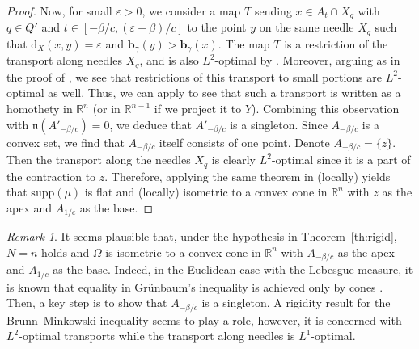 \documentclass[sts]{imsart}
\theoremstyle{definition}
\theoremstyle{remark}
\newtheorem{remark}[theorem]{Remark}
\newcommand{\R}{\mathbb{R}}
\newcommand{\bb}{\mathbf{b}}
\newcommand{\fn}{\mathfrak{n}}
\newcommand{\dist}{\mathrm{d}}
\newcommand{\ve}{\varepsilon}
\newcommand{\supp}{\mathrm{supp}}
\begin{document}
\begin{proof}
Now, for small $\ve >0$, we consider a map $T$ sending $x \in A_t \cap X_q$ with $q \in Q'$ and $t \in [-\beta/c,(\ve-\beta)/c]$ to the point $y$ on the same needle $X_q$ such that $\dist_X(x,y)=\ve$ and $\bb_\gamma(y) >\bb_\gamma(x)$.
The map $T$ is a restriction of the transport along needles $X_q$, and is also $L^2$-optimal by \cite[Lemma~4.1]{CM}.
%
Moreover, arguing as in the proof of \cite[Theorem~4.2]{CM}, we see that restrictions of this transport to small portions are $L^2$-optimal as well.
Thus, we can apply \cite[Theorem~4.2(iii)]{BK} to see that such a transport is written as a homothety in $\R^n$ (or in $\R^{n-1}$ if we project it to $Y$).
Combining this observation with $\fn(A'_{-\beta/c})=0$, we deduce that $A'_{-\beta/c}$ is a singleton.
Since $A_{-\beta/c}$ is a convex set, we find that $A_{-\beta/c}$ itself consists of one point.
%
Denote $A_{-\beta/c}=\{z\}$.
Then the transport along the needles $X_q$ is clearly $L^2$-optimal since it is a part of the contraction to $z$.
Therefore, applying the same theorem in \cite{BK} (locally) yields that $\supp(\mu)$ is flat and (locally) isometric to a convex cone in $\R^n$ with $z$ as the apex and $A_{1/c}$ as the base.
\fi%
\end{proof}

\begin{remark}\label{rm:rigid}
It seems plausible that, under the hypothesis in Theorem~\ref{th:rigid}, $N=n$ holds and $\Omega$ is isometric to a convex cone in $\R^n$ with $A_{-\beta/c}$ as the apex and $A_{1/c}$ as the base.
Indeed, in the Euclidean case with the Lebesgue measure, it is known that equality in Gr\"unbaum's inequality is achieved only by cones \cite{Gr00}.
Then, a key step is to show that $A_{-\beta/c}$ is a singleton.
A rigidity result \cite[Theorem~4.2]{BK} for the Brunn--Minkowski inequality seems to play a role, however, it is concerned with $L^2$-optimal transports while the transport along needles is $L^1$-optimal.
\end{remark}
\end{document}
